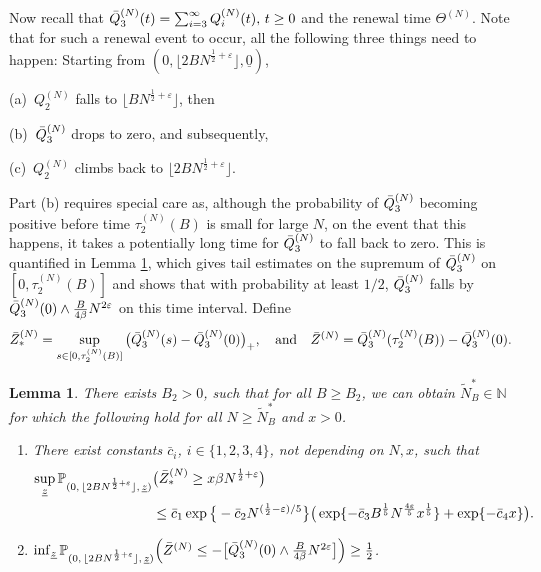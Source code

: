 \documentclass[11pt, reqno]{article}
\newtheorem{lemma}[theorem]{Lemma}
\numberwithin{equation}{section}
\numberwithin{theorem}{section}
\newcommand\blue[1]{#1}
\begin{document}
\blue{Now recall that $\Bar{Q}^{(N)}_3(t)=\sum_{i=3}^{\infty}Q^{(N)}_i(t), \, t \ge 0$ and the renewal time $\Theta^{(N)}$.
Note that for such a renewal event to occur, all the following three things need to happen: 
Starting from $(0, \lfloor 2B N^{\frac{1}{2} + \varepsilon}\rfloor, \underline{0})$,

(a)~$Q_2^{(N)}$ falls to $\lfloor B N^{\frac{1}{2} + \varepsilon}\rfloor$, then 

(b)~$\Bar{Q}^{(N)}_3$ drops to zero, and subsequently, 

(c)~$Q_2^{(N)}$ climbs back to $\lfloor 2B N^{\frac{1}{2} + \varepsilon}\rfloor$. 

\noindent
Part (b) requires special care as, although the probability of $\Bar{Q}^{(N)}_3$ becoming positive before time $\tau_2^{(N)}(B)$ is small for large $N$, on the event that this happens, it takes a potentially long time for $\Bar{Q}^{(N)}_3$ to fall back to zero. 
This is quantified in Lemma \ref{lem:LEMMA-8}, which gives tail estimates on the supremum of $\Bar{Q}^{(N)}_3$ on $[0,\tau_2^{(N)}(B)]$ and shows that with probability at least $1/2$, $\Bar{Q}^{(N)}_3$ falls by $\Bar{Q}^{(N)}_3(0)\wedge \frac{B}{4\beta}N^{2\varepsilon}$ on this time interval.
Define 
\begin{equation}\label{eq:zbar}
        \Bar{Z}^{(N)}_{*} = \sup_{s\in [0,\tau^{(N)}_2(B)]}\big(\Bar{Q}^{(N)}_3(s)-\Bar{Q}^{(N)}_3(0)\big)_+,
    \quad \text{and}\quad
    \Bar{Z}^{(N)} =\Bar{Q}^{(N)}_3(\tau^{(N)}_2(B))-\Bar{Q}^{(N)}_3(0).
\end{equation}}
\begin{lemma}\label{lem:LEMMA-8}
There exists $B_2>0$, such that for all $B\geq B_2$, we can obtain $\tilde N^*_B \in \mathbb{N}$ for which the following hold for all $N \geq \tilde N^*_B$ and $x>0$.
\begin{enumerate}[\normalfont (i)]
    \item There exist constants $\bar{c}_i$, $i\in\{1,2,3,4\}$, not depending on $N,x$, such that 
    \begin{equation}\label{eq:lem3.3-1}
        \begin{split}
            \sup_{\underline{z}}\mathbb{P}_{(0, \, \lfloor 2BN^{\frac{1}{2}+\varepsilon} \rfloor, \,\underline{z})}
        &\big(\Bar{Z}^{(N)}_{*}\geq x\beta N^{\frac{1}{2}+\varepsilon}\big)\\
        &\leq \bar{c}_1\exp \big\{-\bar{c}_2N^{(\frac{1}{2}-\varepsilon)/5}\big\}\big(\exp \{-\bar{c}_3B^{\frac{1}{5}}N^{\frac{4\varepsilon}{5}}x^{\frac{1}{5}}\}+\exp \{-\bar{c}_4x \}\big).
        \end{split}
    \end{equation}
    \item $\inf_{\underline{z}} \mathbb{P}_{(0, \, \lfloor 2BN^{\frac{1}{2}+\varepsilon} \rfloor, \,\underline{z})}\Big(\Bar{Z}^{(N)}\leq -\big[\Bar{Q}^{(N)}_3(0)\wedge \frac{B}{4\beta}N^{2\varepsilon}\big]\Big)\geq \frac{1}{2}$.
\end{enumerate}
\end{lemma}
\end{document}
